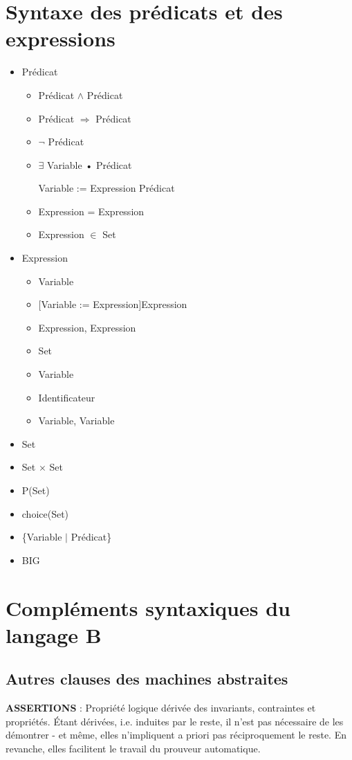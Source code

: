 \documentclass[10pt,a4paper]{article}
\begin{document}
\section{Syntaxe des prédicats et des expressions}
\label{SyntaxPredicatExpression}
\begin{itemize}
\item Prédicat
\begin{itemize}
\item Prédicat $\wedge$ Prédicat
\item Prédicat $\Rightarrow$ Prédicat
\item $\lnot$ Prédicat
\item $\exists$ Variable • Prédicat
\item [Variable := Expression] Prédicat
\item Expression = Expression
\item Expression $\in$ Set
\end{itemize}
\item Expression
\begin{itemize}
\item Variable
\item $[$Variable := Expression$]$Expression
\item Expression, Expression
\item Set
\item Variable
\item Identificateur
\item Variable, Variable
\end{itemize}
\item Set
\item Set $\times$ Set
\item P(Set)
\item choice(Set)
\item \{Variable $|$ Prédicat\}
\item BIG

\end{itemize}

\section{Compléments syntaxiques du langage B}
\label{ComplementSyntaxique}
\subsection{Autres clauses des machines abstraites}

\textbf{ASSERTIONS} : Propriété logique dérivée des invariants, contraintes et propriétés. Étant dérivées, i.e. induites par le reste, il n'est pas nécessaire de les démontrer - et même, elles n'impliquent a priori pas réciproquement le reste. En revanche, elles facilitent le travail du prouveur automatique.
\end{document}
